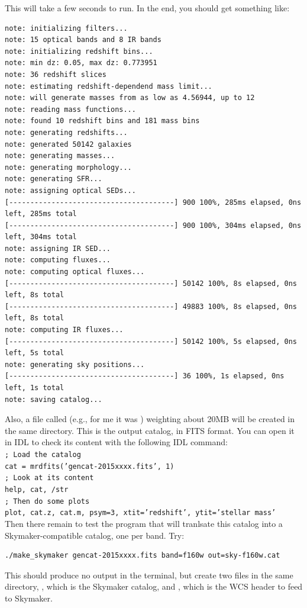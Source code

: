 \documentclass[12pt,a4paper]{article}
\begin{document}
This will take a few seconds to run. In the end, you should get something like:
\begin{verbatim}
note: initializing filters...
note: 15 optical bands and 8 IR bands
note: initializing redshift bins...
note: min dz: 0.05, max dz: 0.773951
note: 36 redshift slices
note: estimating redshift-dependend mass limit...
note: will generate masses from as low as 4.56944, up to 12
note: reading mass functions...
note: found 10 redshift bins and 181 mass bins
note: generating redshifts...
note: generated 50142 galaxies
note: generating masses...
note: generating morphology...
note: generating SFR...
note: assigning optical SEDs...
[---------------------------------------] 900 100%, 285ms elapsed, 0ns left, 285ms total
[---------------------------------------] 900 100%, 304ms elapsed, 0ns left, 304ms total
note: assigning IR SED...
note: computing fluxes...
note: computing optical fluxes...
[---------------------------------------] 50142 100%, 8s elapsed, 0ns left, 8s total
[---------------------------------------] 49883 100%, 8s elapsed, 0ns left, 8s total
note: computing IR fluxes...
[---------------------------------------] 50142 100%, 5s elapsed, 0ns left, 5s total
note: generating sky positions...
[---------------------------------------] 36 100%, 1s elapsed, 0ns left, 1s total
note: saving catalog...
\end{verbatim}

Also, a file called  (e.g., for me it was ) weighting about 20MB will be created in the same directory. This is the output catalog, in FITS format. You can open it in IDL to check its content with the following IDL command: \\[0.5cm]
\noindent \texttt{\color{gray}; Load the catalog} \\
\noindent \texttt{cat = mrdfits({\color{DodgerBlue}'gencat-2015xxxx.fits'}, {\color{red}1})} \\
\noindent \texttt{\color{gray}; Look at its content} \\
\noindent \texttt{{\color{Green}help}, cat, /str} \\
\noindent \texttt{\color{gray}; Then do some plots} \\
\noindent \texttt{{\color{Green}plot}, cat.z, cat.m, psym={\color{red}3}, xtit={\color{DodgerBlue}'redshift'}, ytit={\color{DodgerBlue}'stellar mass'}} \\

Then there remain to test the program that will tranlsate this catalog into a Skymaker-compatible catalog, one per band. Try:
\begin{verbatim}
./make_skymaker gencat-2015xxxx.fits band=f160w out=sky-f160w.cat
\end{verbatim}

This should produce no output in the terminal, but create two files in the same directory, , which is the Skymaker catalog, and , which is the WCS header to feed to Skymaker.
\end{document}
